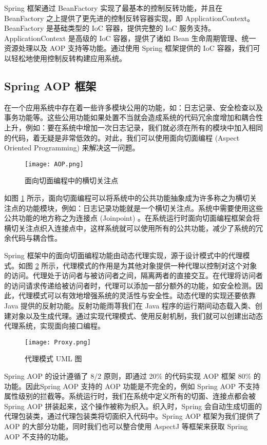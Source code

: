 Spring 框架通过 BeanFactory 实现了最基本的控制反转功能，并且在 BeanFactory 之上提供了更先进的控制反转容器实现，即 ApplicationContext。BeanFactory 是基础类型的 IoC 容器，提供完整的 IoC 服务支持。 ApplicationContext 是高级的 IoC 容器，提供了诸如 Bean 生命周期管理、统一资源处理以及 AOP 支持等功能。通过使用 Spring 框架提供的 IoC 容器，我们可以轻松地使用控制反转构建应用系统。

\subsection{Spring AOP 框架}

在一个应用系统中存在着一些许多模块公用的功能，如：日志记录、安全检查以及事务功能等。这些公用功能如果处置不当就会造成系统的代码冗余度增加和耦合性上升，例如：要在系统中增加一次日志记录，我们就必须在所有的模块中加入相同的代码，着无疑是非常低效的。对此，我们可以使用面向切面编程 (Aspect Oriented Programming) 来解决这一问题。

\begin{figure}[!ht]
    \centering
    \texttt{[image: AOP.png]}
    \caption{面向切面编程中的横切关注点}
    \label{fig:AOP}
\end{figure}

如图 \ref{fig:AOP} 所示，面向切面编程可以将系统中的公共功能抽象成为许多称之为横切关注点的功能模块，例如：日志记录功能就是一个横切关注点。系统中需要使用这些公共功能的地方称之为连接点 (Joinpoint) 。在系统运行时面向切面编程框架会将横切关注点织入连接点中，这样系统就可以使用所有的公共功能，减少了系统的冗余代码与耦合性。

Spring 框架中的面向切面编程功能由动态代理实现，源于设计模式中的代理模式。如图 \ref{fig:Proxy} 所示，代理模式的作用是为其他对象提供一种代理以控制对这个对象的访问。代理处于访问者与被访问者之间，隔离两者的直接交互。在代理将访问者的访问请求传递给被访问者时，代理可以添加一部分额外的功能，如安全检测。因此，代理模式可以有效地增强系统的灵活性与安全性。动态代理的实现还要依靠 Java 提供的反射功能。反射功能雨荨我们在 Java 程序的运行期间动态载入类、创建对象以及生成代理。通过实现代理模式、使用反射机制，我们就可以创建出动态代理系统，实现面向接口编程。

\begin{figure}[!ht]
    \centering
    \texttt{[image: Proxy.png]}
    \caption{代理模式 UML 图}
    \label{fig:Proxy}
\end{figure}

Spring AOP 的设计遵循了 8/2 原则，即通过 20\% 的代码实现 AOP
 框架 80\% 的功能。因此Spring AOP 支持的 AOP 功能是不完全的，例如 Spring AOP 不支持属性级别的拦截等。系统运行时，我们在系统中定义所有的切面、连接点都会被 Spring AOP 拼装起来，这个操作被称为织入。织入时，Spring 会自动生成切面的代理包装类，通过代理包装类将切面织入代码中。Spring AOP 框架为我们提供了 AOP 的大部分功能，同时我们也可以整合使用 AspectJ 等框架来获取 Spring AOP 不支持的功能。
 
